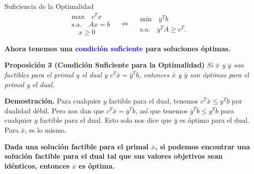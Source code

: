 \documentclass{beamer}
\begin{document}
\begin{frame}{Suficiencia de la Optimalidad}
    \[
    \begin{array}{c}
    \text{max} \quad c^T x \\
    \text{s.a.} \quad Ax = b \\
    \quad x \geq 0
    \end{array}
    \quad \Leftrightarrow \quad
    \begin{array}{c}
    \text{min} \quad y^T b \\
    \text{s.a.} \quad y^T A \geq c^T.
    \end{array}
    \]

    \vspace{0.3cm}
    \textbf{Ahora tenemos una \textcolor{blue}{condición suficiente} para soluciones óptimas.}

    \vspace{0.5cm}
    \begin{block}{\textbf{Proposición 3 (Condición Suficiente para la Optimalidad)}}
        \textit{Si \(\bar{x}\) y \(\bar{y}\) son factibles para el primal y el dual y \( c^T \bar{x} = \bar{y}^T b \), entonces \(\bar{x}\) y \(\bar{y}\) son óptimos para el primal y el dual.}
    \end{block}

    \vspace{0.3cm}
    \textbf{Demostración.} Para cualquier \( y \) factible para el dual, tenemos \( c^T \bar{x} \leq y^T b \) por dualidad débil. Pero nos dan que \( c^T \bar{x} = \bar{y}^T b \), así que tenemos \( \bar{y}^T b \leq y^T b \) para cualquier \( y \) factible para el dual. Esto solo nos dice que \(\bar{y}\) es óptimo para el dual. Para \(\bar{x}\), es lo mismo.

    \vspace{0.3cm}
    \textbf{Dada una solución factible para el primal \(\bar{x}\), si podemos encontrar una solución factible para el dual tal que sus valores objetivos sean \textbf{idénticos}, entonces \(\bar{x}\) es óptima.}
\end{frame}
\end{document}

